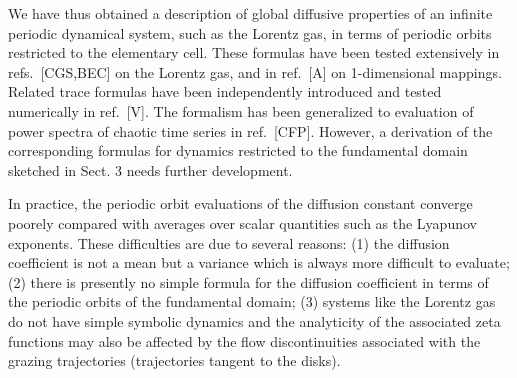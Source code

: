 
We have thus obtained a description of global diffusive
properties of an infinite periodic dynamical
system, such as the Lorentz gas, in terms of periodic orbits
restricted to the elementary cell.
These formulas have been tested extensively
in refs.~[CGS,BEC] on the Lorentz gas, and in ref.~[A] on 1-dimensional
mappings.
Related trace formulas have been independently introduced
and tested numerically in ref.~[V].
The formalism has been generalized to evaluation of
power spectra of chaotic time series in ref.~[CFP].
However, a derivation of the corresponding formulas for dynamics restricted
to the fundamental domain sketched in Sect. 3 needs further development.

In practice, the periodic orbit evaluations
of the diffusion constant converge poorely compared with averages over scalar
quantities such as the Lyapunov exponents.  These difficulties are due to
several reasons: (1) the diffusion coefficient is not a mean but a variance
which is always more difficult to evaluate;
(2) there is presently no simple formula for the diffusion
coefficient in terms of the periodic orbits of the fundamental domain; (3)
systems like the Lorentz gas do not have simple symbolic dynamics and
the analyticity of the associated zeta functions may also be affected
by the flow discontinuities associated with the grazing trajectories
(trajectories tangent to the disks).

